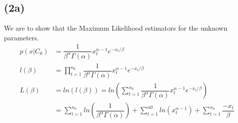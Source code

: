 \documentclass[12pt, letterpaper]{article}
\begin{document}
    \subsection*{(2a)}
      We are to show that the Maximum Likelihood estimators for the unknown parameters.
      \begin{align*}
        p(x|C_0) & = \dfrac{1}{\beta^\alpha\Gamma(\alpha)}x_{t}^{\alpha-1}e^{-x_{t}/\beta}\\
        l(\beta) & = \prod_{t=1}^{n_0} \dfrac{1}{\beta^\alpha \Gamma(\alpha)}x_{t}^{\alpha-1}e^{-x_{t}/\beta}\\
        L(\beta) & = ln(l(\beta)) = ln(\sum_{t=1}^{n_0}\dfrac{1}{\beta^\alpha \Gamma(\alpha)}x_{t}^{\alpha-1}e^{-x_{t}/\beta})\\
        & =\sum_{t=1}^{n_0}ln(\dfrac{1}{\beta^\alpha \Gamma(\alpha)}) + \sum_{t=1}^{n0}ln(x_{t}^{\alpha-1}) + \sum_{t=1}^{n_0} \dfrac{-x_t}{\beta}
      \end{align*}
\end{document}
